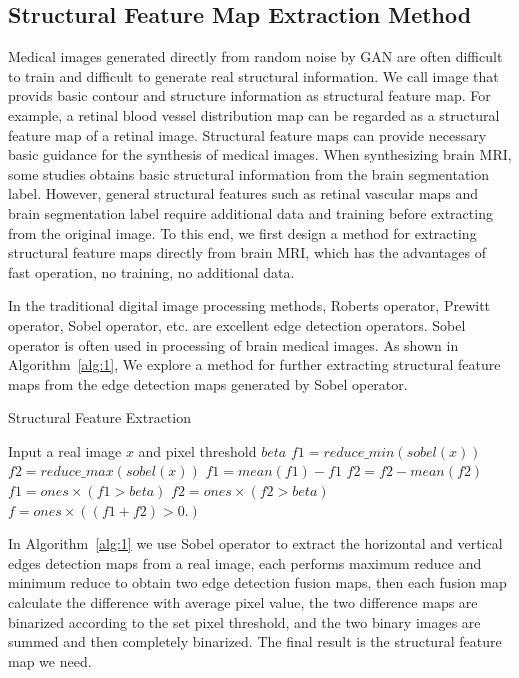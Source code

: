 \documentclass[letterpaper]{article} %
\begin{document}
\subsection{Structural Feature Map Extraction Method}
Medical images generated directly from random noise by GAN are often difficult to train and difficult to generate real structural information. We call image that provids basic contour and structure information as structural feature map. For example, a retinal blood vessel distribution map can be regarded as a structural feature map of a retinal image\cite{41costa2017towards}. Structural feature maps can provide necessary basic guidance for the synthesis of medical images. When synthesizing brain MRI, some studies obtains basic structural information from the brain segmentation label\cite{4shin2018medical}. However, general structural features such as retinal vascular maps and brain segmentation label require additional data and training before extracting from the original image. To this end, we first design a method for extracting structural feature maps directly from brain MRI, which has the advantages of fast operation, no training, no additional data.

In the traditional digital image processing methods, Roberts operator, Prewitt operator, Sobel operator, etc. are excellent edge detection operators. Sobel operator is often used in processing of brain medical images. As shown in Algorithm~\ref{alg:1}, We explore a method for further extracting structural feature maps from the edge detection maps generated by Sobel operator.
\begin{algorithm}
	\caption{Structural Feature Extraction}
	\label{alg:1}
	\begin{algorithmic}[1]
		\State Input a real image $x$ and pixel threshold $beta$
		\State $f1 = reduce\_min(sobel(x))$
		\State $f2 = reduce\_max(sobel(x))$
		\State $f1 = mean(f1) - f1$
		\State $f2 = f2 - mean(f2)$
		\State $f1 = ones \times (f1 > beta)$
		\State $f2 = ones \times (f2 > beta)$
		\State $f = ones \times ((f1 + f2)> 0.)$
	\end{algorithmic}  
\end{algorithm}

In Algorithm~\ref{alg:1} we use Sobel operator to extract the horizontal and vertical edges detection maps from a real image, each performs maximum  reduce and minimum reduce to obtain two edge detection fusion maps, then each fusion map calculate the difference with average pixel value, the two difference maps are binarized according to the set pixel threshold, and the two binary images are summed and then completely binarized. The final result is the structural feature map we need.
\end{document}
